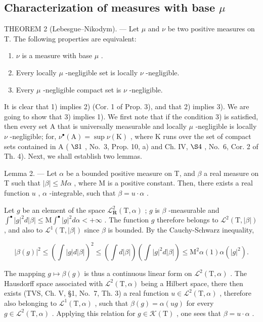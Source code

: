 \subsection{\texorpdfstring{Characterization of measures with base \(\mu\)}{Characterization of measures with base mu}}

THEOREM 2 (Lebesgue--Nikodym). --- Let \(\mu\) and \(\nu\) be two positive measures on T. The following properties are equivalent:

\begin{enumerate}
\def\labelenumi{\arabic{enumi})}
\item
  \(\nu\) is a measure with base \(\mu\) .
\item
  Every locally \(\mu\) -negligible set is locally \(\nu\) -negligible.
\item
  Every \(\mu\) -negligible compact set is \(\nu\) -negligible.
\end{enumerate}

It is clear that 1) implies 2) (Cor. 1 of Prop. 3), and that 2) implies 3). We are going to show that 3) implies 1). We first note that if the condition 3) is satisfied, then every set A that is universally measurable and locally \(\mu\) -negligible is locally \(\nu\) -negligible; for, \(\nu^{\bullet}(\mathrm{A}) = \sup \nu(\mathrm{K})\) , where K runs over the set of compact sets contained in A ( \(\S 1\) , No.~3, Prop. 10, a) and Ch. IV, \(\S 4\) , No.~6, Cor. 2 of Th. 4). Next, we shall establish two lemmas.

Lemma 2. --- Let \(\alpha\) be a bounded positive measure on T, and \(\beta\) a real measure on T such that \(|\beta| \leqslant M\alpha\) , where M is a positive constant. Then, there exists a real function \(u\) , \(\alpha\) -integrable, such that \(\beta = u \cdot \alpha\) .

Let \(g\) be an element of the space \(\mathcal{L}_{\mathbf{R}}^{2}(\mathrm{T},\alpha)\) ; \(g\) is \(\beta\) -measurable and \(\int^{\bullet}|g|^2 d|\beta| \leqslant \mathrm{M}\int^{\bullet}|g|^2 d\alpha < +\infty\) . The function \(g\) therefore belongs to \(\mathcal{L}^2 (\mathrm{T},|\beta|)\) , and also to \(\mathcal{L}^1 (\mathrm{T},|\beta|)\) since \(\beta\) is bounded. By the Cauchy-Schwarz inequality,

\[
| \beta (g) | ^ {2} \leqslant \left(\int | g | d | \beta |\right) ^ {2} \leqslant \left(\int d | \beta |\right) \left(\int | g | ^ {2} d | \beta |\right) \leqslant \mathrm{M} ^ {2} \alpha (1) \alpha (| g | ^ {2}).
\]

The mapping \(g \mapsto \beta(g)\) is thus a continuous linear form on \(\mathcal{L}^2(\mathrm{T},\alpha)\) . The Hausdorff space associated with \(\mathcal{L}^2(\mathrm{T},\alpha)\) being a Hilbert space, there then exists (TVS, Ch. V, §1, No.~7, Th. 3) a real function \(u \in \mathcal{L}^2(\mathrm{T},\alpha)\) , therefore also belonging to \(\mathcal{L}^1(\mathrm{T},\alpha)\) , such that \(\beta(g) = \alpha(ug)\) for every \(g \in \mathcal{L}^2(\mathrm{T},\alpha)\) . Applying this relation for \(g \in \mathcal{K}(\mathrm{T})\) , one sees that \(\beta = u\cdot \alpha\) .

